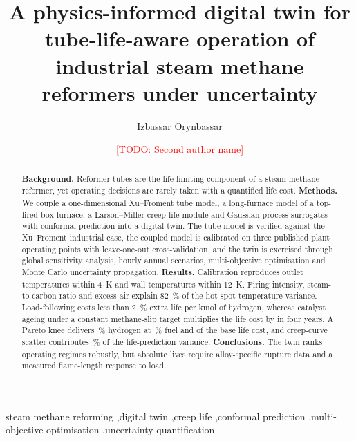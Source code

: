 \documentclass[preprint,12pt]{elsarticle}
\newcommand{\todo}[1]{\textcolor{red}{[TODO: #1]}}
\begin{document}
\begin{frontmatter}

\title{A physics-informed digital twin for tube-life-aware operation of industrial steam methane reformers under uncertainty}

\author[su]{Izbassar Orynbassar}
\author[sua]{\todo{Second author name}}
\address[su]{School of Information Studies, Syracuse University, Syracuse, NY, USA}
\address[sua]{Safi Utebayev Atyrau University of Oil and Gas, Atyrau, Kazakhstan}

\begin{abstract}
\textbf{Background.} Reformer tubes are the life-limiting component of a steam methane reformer, yet operating decisions are rarely
taken with a quantified life cost.
\textbf{Methods.} We couple a one-dimensional Xu--Froment tube model, a long-furnace model of a top-fired box furnace, a
Larson--Miller creep-life module and Gaussian-process surrogates with conformal prediction into a digital twin. The tube model is
verified against the Xu--Froment industrial case, the coupled model is calibrated on three published plant operating points with
leave-one-out cross-validation, and the twin is exercised through global sensitivity analysis, hourly annual scenarios,
multi-objective optimisation and Monte Carlo uncertainty propagation.
\textbf{Results.} Calibration reproduces outlet temperatures within \SI{4}{K} and wall temperatures within \SI{12}{K}. Firing
intensity, steam-to-carbon ratio and excess air explain \SI{82}{\percent} of the hot-spot temperature variance. Load-following
costs less than \SI{2}{\percent} extra life per kmol of hydrogen, whereas catalyst ageing under a constant methane-slip target
multiplies the life cost by \SxAgeSlip{} in four years. A Pareto knee delivers \kneeHtwo{}\,\% hydrogen at \kneeFuel{}\,\% fuel and
\kneeLife{} of the base life cost, and creep-curve scatter contributes \shareCreep{}\,\% of the life-prediction variance.
\textbf{Conclusions.} The twin ranks operating regimes robustly, but absolute lives require alloy-specific rupture data and a measured
flame-length response to load.
\end{abstract}

\begin{keyword}
steam methane reforming \sep digital twin \sep creep life \sep conformal prediction \sep multi-objective optimisation \sep uncertainty quantification
\end{keyword}

\end{frontmatter}

\linenumbers










\end{document}
